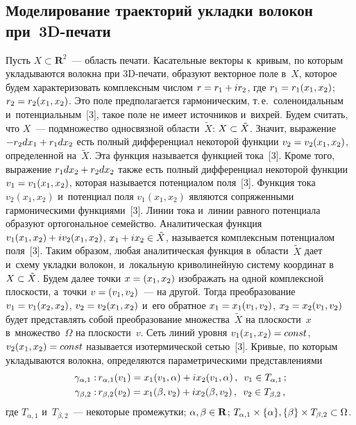 \begin{multicols}{2}
\section{Моделирование траекторий укладки волокон  
при~3D-печати}

  Пусть $X\subset \mathbf{R}^2$~---  об\-ласть печати. Касательные векторы 
к~кривым, по которым укладываются волокна при 3D-пе\-ча\-ти, образуют 
векторное поле в~$X$, которое будем характеризовать комплексным чис\-лом 
$r\hm= r_1\hm+ ir_2$, где $r_1\hm= r_1(x_1, x_2)$; $r_2\hm= r_2(x_1, x_2)$. Это 
поле предполагается гармоническим, т.\,е.\ соленоидальным и~потенциальным~[3], 
такое поле не имеет источников и~вих\-рей. Будем считать, что $X$~--- 
подмножество односвязной области~$\tilde{X}$: $X\hm\subset \tilde{X}$. Значит, 
выражение $-r_2dx_1\hm+ r_1dx_2$ есть полный дифференциал некоторой 
функции $v_2\hm= v_2(x_1, x_2)$, определенной на~$\tilde{X}$. Эта функция 
называется функцией тока~[3]. Кроме того, выражение $r_1dx_2\hm+ r_2dx_2$ 
также есть полный дифференциал некоторой функции $v_1\hm= v_1(x_1, x_2)$, 
которая называется потенциалом поля~[3]. Функция тока $v_2(x_1, x_2)$  
и~потенциал поля $v_1(x_1, x_2)$ являются сопряженными гармоническими 
функциями~[3]. Линии тока и~линии равного потенциала образуют ортогональное 
семейство. Аналитическая функция $v_1(x_1, x_2)\hm+ iv_2(x_1,x_2)$, $x_1\hm+ 
ix_2\hm\in \tilde{X}$, называется комплексным потенциалом поля~[3]. Таким 
образом, любая аналитическая функция в~об\-ласти~$\tilde{X}$ дает и~схему 
уклад\-ки волокон, и~локальную криволинейную систему координат в~$X\hm\subset 
\tilde{X}$. Будем далее точ\-ки $x\hm= (x_1, x_2)$ изображать на одной 
комплексной плос\-кости, а~точ\-ки $v\hm= (v_1, v_2)$~--- на другой. Тогда 
преобразование $v_1\hm=v_1(x_2, x_2)$, $v_2\hm= v_2(x_1, x_2)$ и~его обратное 
$x_1\hm= x_1(v_1, v_2)$, $x_2\hm= x_2(v_1, v_2)$ будет пред\-став\-лять собой 
преобразование множества~$\tilde{X}$ на плоскости~$x$ в~множество~$\Omega$ 
на плоскости~$v$. Сеть линий уров\-ня $v_1(x_1, x_2)\hm=const$, $v_2(x_1, 
x_2)\hm= const$ называется изотермической сетью~[3]. Кривые, по которым 
укладываются волокна, определяются па\-ра\-мет\-ри\-че\-ски\-ми пред\-став\-ле\-ни\-ями
  \begin{align*}
  \gamma_{\alpha,1}:\,& r_{\alpha,1} (v_1) 
=x_1(v_1,\alpha)+ix_2(v_1,\alpha)\,,\enskip v_1\in T_{\alpha,1}\,;\\
  \gamma_{\beta,2}:\, & r_{\beta,2} (v_2) =x_1(\beta, v_2)+ix_2(\beta, v_2)\,,\enskip 
v_2\in T_{\beta,2}\,,
  \end{align*}
где $T_{\alpha,1}$ и~$T_{\beta,2}$~--- некоторые промежутки; $\alpha, \beta \hm\in 
\mathbf{R}$; $T_{\alpha,1} \times \{\alpha\}, \{\beta\}\times 
T_{\beta,2}\hm\subset\Omega$.
  

\end{multicols}
